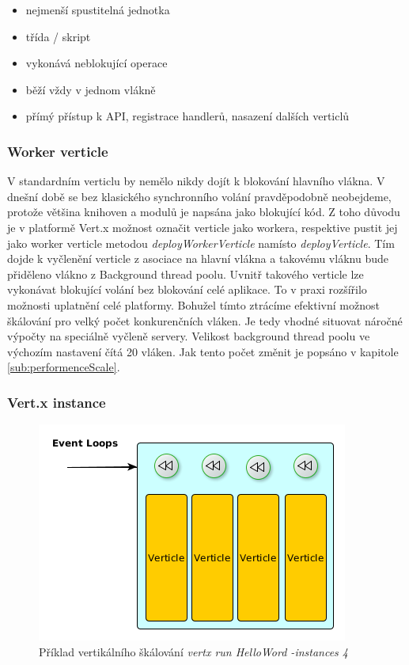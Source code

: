\begin{itemize}
\item nejmenší spustitelná jednotka
\item třída / skript
\item vykonává neblokující operace
\item běží vždy v jednom vlákně
\item přímý přístup k API, registrace handlerů, nasazení dalších verticlů
\end{itemize}

\subsubsection{Worker verticle}

V standardním verticlu by nemělo nikdy dojít k blokování hlavního vlákna. V dnešní době se bez klasického synchronního volání pravděpodobně neobejdeme, protože většina knihoven a modulů je napsána jako blokující kód. Z toho důvodu je v platformě Vert.x možnost označit verticle jako workera, respektive pustit jej jako worker verticle metodou \emph{deployWorkerVerticle} namísto \emph{deployVerticle}. Tím dojde k vyčlenění verticle z asociace na hlavní vlákna a takovému vláknu bude přiděleno vlákno z Background thread poolu. Uvnitř takového verticle lze vykonávat blokující volání bez blokování celé aplikace. To v praxi rozšířilo možnosti uplatnění celé platformy. Bohužel tímto ztrácíme efektivní možnost škálování pro velký počet konkurenčních vláken. Je tedy vhodné situovat náročné výpočty na speciálně vyčleně servery. Velikost background thread poolu ve výchozím nastavení čítá 20 vláken. Jak tento počet změnit je popsáno v kapitole \ref{sub:performenceScale}.

\subsubsection{Vert.x instance}

\begin{figure}[h]
\begin{centering}
\includegraphics[scale=0.5]{obrazky/instance4}
\par\end{centering}
\caption{Příklad vertikálního škálování \emph{vertx run HelloWord -instances 4} \label{fig:instance4}}
\end{figure}

